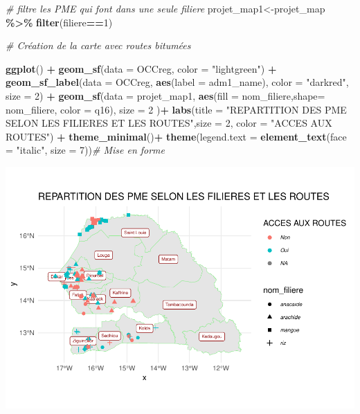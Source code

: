 \documentclass[
]{article}
\newenvironment{Shaded}{\begin{snugshade}}{\end{snugshade}}
\newcommand{\AttributeTok}[1]{\textcolor[rgb]{0.13,0.29,0.53}{#1}}
\newcommand{\CommentTok}[1]{\textcolor[rgb]{0.56,0.35,0.01}{\textit{#1}}}
\newcommand{\DecValTok}[1]{\textcolor[rgb]{0.00,0.00,0.81}{#1}}
\newcommand{\FunctionTok}[1]{\textcolor[rgb]{0.13,0.29,0.53}{\textbf{#1}}}
\newcommand{\NormalTok}[1]{#1}
\newcommand{\OtherTok}[1]{\textcolor[rgb]{0.56,0.35,0.01}{#1}}
\newcommand{\SpecialCharTok}[1]{\textcolor[rgb]{0.81,0.36,0.00}{\textbf{#1}}}
\newcommand{\StringTok}[1]{\textcolor[rgb]{0.31,0.60,0.02}{#1}}
\begin{document}
\begin{Shaded}
\begin{Highlighting}[]
\CommentTok{\# filtre les PME qui font dans une seule filiere}
\NormalTok{projet\_map1}\OtherTok{\textless{}{-}}\NormalTok{projet\_map }\SpecialCharTok{\%\textgreater{}\%} \FunctionTok{filter}\NormalTok{(filiere}\SpecialCharTok{==}\DecValTok{1}\NormalTok{) }

\CommentTok{\# Création de la carte avec routes bitumées}

\FunctionTok{ggplot}\NormalTok{() }\SpecialCharTok{+}
  \FunctionTok{geom\_sf}\NormalTok{(}\AttributeTok{data =}\NormalTok{ OCCreg, }\AttributeTok{color =} \StringTok{"lightgreen"}\NormalTok{) }\SpecialCharTok{+}
  \FunctionTok{geom\_sf\_label}\NormalTok{(}\AttributeTok{data =}\NormalTok{ OCCreg, }
                \FunctionTok{aes}\NormalTok{(}\AttributeTok{label =}\NormalTok{ adm1\_name), }\AttributeTok{color =} \StringTok{"darkred"}\NormalTok{, }\AttributeTok{size =} \DecValTok{2}\NormalTok{) }\SpecialCharTok{+}
  \FunctionTok{geom\_sf}\NormalTok{(}\AttributeTok{data =}\NormalTok{ projet\_map1, }
          \FunctionTok{aes}\NormalTok{(}\AttributeTok{fill =}\NormalTok{ nom\_filiere,}\AttributeTok{shape=}\NormalTok{ nom\_filiere, }\AttributeTok{color =}\NormalTok{ q16), }\AttributeTok{size =} \DecValTok{2}\NormalTok{ )}\SpecialCharTok{+}
  \FunctionTok{labs}\NormalTok{(}\AttributeTok{title =} \StringTok{"REPARTITION DES PME SELON LES FILIERES ET LES ROUTES"}\NormalTok{,}\AttributeTok{size =} \DecValTok{2}\NormalTok{,}
       \AttributeTok{color =} \StringTok{"ACCES AUX ROUTES"}\NormalTok{) }\SpecialCharTok{+}
  \FunctionTok{theme\_minimal}\NormalTok{()}\SpecialCharTok{+}
  \FunctionTok{theme}\NormalTok{(}\AttributeTok{legend.text =} \FunctionTok{element\_text}\NormalTok{(}\AttributeTok{face =} \StringTok{"italic"}\NormalTok{, }\AttributeTok{size =} \DecValTok{7}\NormalTok{))}\CommentTok{\# Mise en forme }
\end{Highlighting}
\end{Shaded}

\begin{center}\includegraphics{Projet_R_ISE_1_files/figure-latex/unnamed-chunk-41-1} \end{center}
\end{document}
